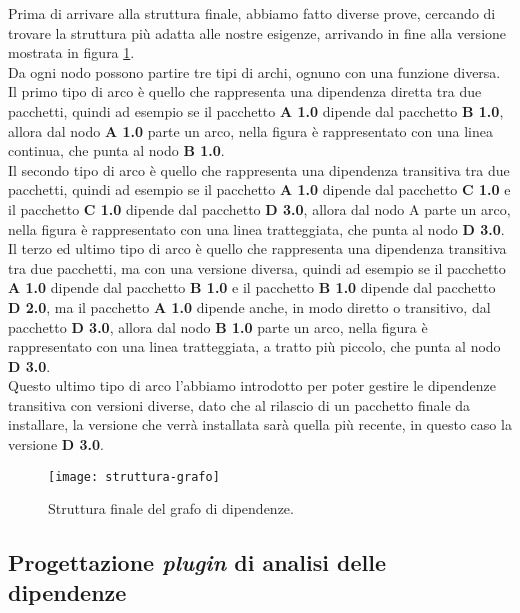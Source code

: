 Prima di arrivare alla struttura finale, abbiamo fatto diverse prove, cercando di trovare la struttura più adatta alle nostre esigenze,
arrivando in fine alla versione mostrata in figura \ref{fig:struttura-grafo}.\\
Da ogni nodo possono partire tre tipi di archi, ognuno con una funzione diversa.
Il primo tipo di arco è quello che rappresenta 
una dipendenza diretta tra due pacchetti, quindi ad esempio se il pacchetto \textbf{A 1.0} dipende dal pacchetto \textbf{B 1.0}, 
allora dal nodo \textbf{A 1.0} parte un arco, nella figura è rappresentato con una linea continua, che punta al nodo \textbf{B 1.0}.\\
Il secondo tipo di arco è quello che rappresenta una dipendenza transitiva tra due pacchetti, quindi ad esempio se il pacchetto
\textbf{A 1.0} dipende dal pacchetto \textbf{C 1.0} e il pacchetto \textbf{C 1.0} dipende dal pacchetto \textbf{D 3.0},
allora dal nodo A parte un arco, nella figura è rappresentato con una linea tratteggiata, che punta al nodo \textbf{D 3.0}.\\
Il terzo ed ultimo tipo di arco è quello che rappresenta una dipendenza transitiva tra due pacchetti, ma con una versione diversa,
quindi ad esempio se il pacchetto \textbf{A 1.0} dipende dal pacchetto \textbf{B 1.0} e il pacchetto \textbf{B 1.0} dipende dal pacchetto 
\textbf{D 2.0}, ma il pacchetto \textbf{A 1.0} dipende anche, in modo diretto o transitivo, dal pacchetto \textbf{D 3.0}, 
allora dal nodo \textbf{B 1.0} parte un arco, nella figura è rappresentato con una linea tratteggiata, a tratto più piccolo, 
che punta al nodo \textbf{D 3.0}.\\
Questo ultimo tipo di arco l'abbiamo introdotto per poter gestire le dipendenze transitiva con versioni diverse, dato che al rilascio di un
pacchetto finale da installare, la versione che verrà installata sarà quella più recente, in questo caso la versione \textbf{D 3.0}.\\

\begin{figure}[!h] 
  \centering 
  \texttt{[image: struttura-grafo]} 
  \caption{Struttura finale del grafo di dipendenze.}
  \label{fig:struttura-grafo}
\end{figure}

\subsection*{Progettazione \textit{plugin} di analisi delle dipendenze}


